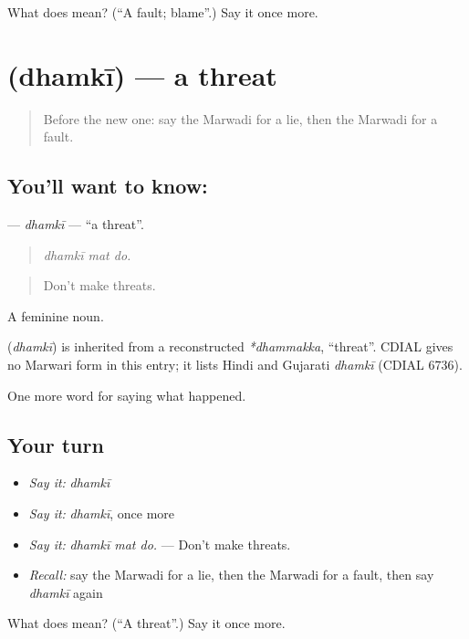 \begin{tcolorbox}[breakable,colback=teal!4,colframe=teal!35!black,title={Before you move on}]
What does  mean? (\textquotedblleft{}A fault; blame\textquotedblright{}.) Say it once more.
\end{tcolorbox}
\section[\texorpdfstring{\mw{धमकी} (dhamkī)}{धमकी (dhamkī)}]{ (dhamkī) — a threat}

\label{lesson:MW-C244-dhamki}



\begin{quote}
Before the new one: say the Marwadi for a lie, then the Marwadi for a fault.
\end{quote}

\subsection*{You'll want to know: }
\textbf{} — \emph{dhamkī} — \textquotedblleft{}a threat\textquotedblright{}.

\begin{quote}
  
\end{quote}

\begin{quote}
\emph{dhamkī mat do.}
\end{quote}

\begin{quote}
Don't make threats.
\end{quote}

A feminine noun.

\begin{cousinweb}
\textbf{} (\emph{dhamkī}) is inherited from a reconstructed \emph{*dhammakka}, \textquotedblleft{}threat\textquotedblright{}. CDIAL gives no Marwari form in this entry; it lists Hindi and Gujarati \emph{dhamkī} (CDIAL 6736).
\end{cousinweb}

\begin{grammarlens}[title={What you've built}]
One more word for saying what happened.
\end{grammarlens}

\subsection*{Your turn}
\begin{itemize}
\raggedright
  \item \emph{Say it:} \emph{dhamkī}
  \item \emph{Say it:} \emph{dhamkī}, once more
  \item \emph{Say it:} \emph{dhamkī mat do.} — Don't make threats.
  \item \emph{Recall:} say the Marwadi for a lie, then the Marwadi for a fault, then say \emph{dhamkī} again
\end{itemize}

\begin{tcolorbox}[breakable,colback=teal!4,colframe=teal!35!black,title={Before you move on}]
What does  mean? (\textquotedblleft{}A threat\textquotedblright{}.) Say it once more.
\end{tcolorbox}
